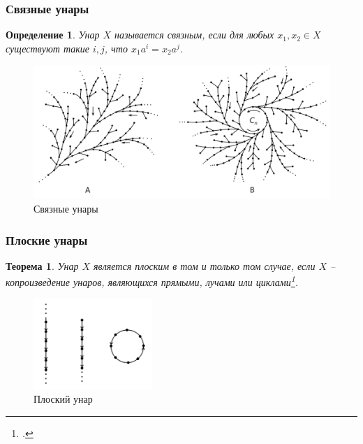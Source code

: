 \documentclass[11pt, notheorems]{beamer}
\newtheorem{definition}{Определение}
\newtheorem{theorem}{Теорема}
\begin{document}
\begin{frame}
	\frametitle{Связные унары}

	\begin{definition}
		Унар $X$ называется \textit{связным}, если для любых $x_1, x_2 \in X$ существуют такие $i, j$, что $x_1 a^i = x_2 a^j$.
	\end{definition}

	\begin{figure}
		\center
		\includegraphics[width=1.0\textwidth]{connected_unars}
		\caption{Связные унары}
	\end{figure}
\end{frame}

\begin{frame}
	\frametitle{Плоские унары}

	\begin{theorem}
		Унар $X$ является плоским в том и только том случае, если $X$ -- копроизведение унаров, являющихся прямыми, лучами или циклами\footcite[теорема]{flat_unars}.
	\end{theorem}

	\begin{figure}
		\center
		\includegraphics[width=0.4\textwidth]{flat_unar_1.png}
		\caption{Плоский унар}
	\end{figure}
\end{frame}
\end{document}

